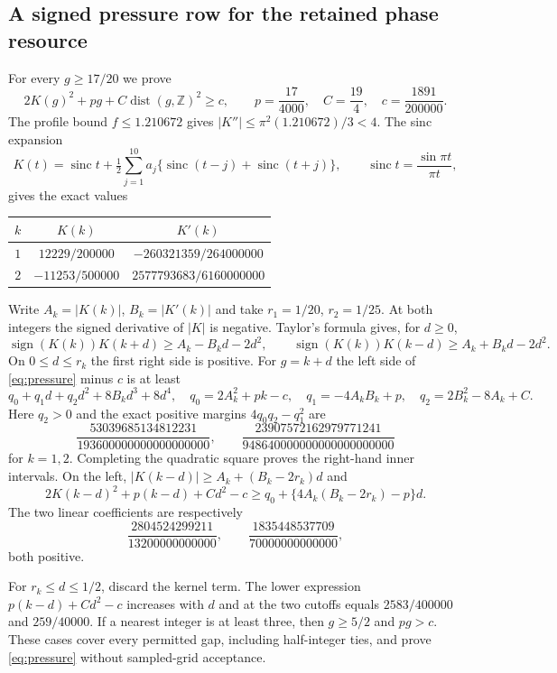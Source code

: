 \documentclass[11pt,reqno]{amsart}
\numberwithin{equation}{section}
\newcommand{\Z}{\mathbb Z}
\newcommand{\dist}{\operatorname{dist}}
\newcommand{\sinc}{\operatorname{sinc}}
\begin{document}
\subsection{A signed pressure row for the retained phase resource}
\label{sec:bootstrap}


For every $g\ge17/20$ we prove
\begin{equation}
 2K(g)^2+pg+C\dist(g,\Z)^2\ge c,
 \qquad p=\frac{17}{4000},\quad C=\frac{19}{4},\quad
 c=\frac{1891}{200000}.
 \label{eq:pressure}
\end{equation}
The profile bound $f\le1.210672$ gives
$|K''|\le\pi^2(1.210672)/3<4$.
The sinc expansion
\[
 K(t)=\sinc t+\tfrac12\sum_{j=1}^{10}a_j
 \{\sinc(t-j)+\sinc(t+j)\},\qquad
 \sinc t=\frac{\sin\pi t}{\pi t},
\]
gives the exact values
\begin{center}
\begin{tabular}{ccc}
\toprule $k$ & $K(k)$ & $K'(k)$\\\midrule
$1$ & $12229/200000$ & $-260321359/264000000$\\
$2$ & $-11253/500000$ & $2577793683/6160000000$\\\bottomrule
\end{tabular}
\end{center}
Write $A_k=|K(k)|$, $B_k=|K'(k)|$ and take
$r_1=1/20$, $r_2=1/25$. At both integers the signed derivative of
$|K|$ is negative. Taylor's formula gives, for $d\ge0$,
\[
 \operatorname{sign}(K(k))K(k+d)\ge A_k-B_kd-2d^2,
 \qquad
 \operatorname{sign}(K(k))K(k-d)\ge A_k+B_kd-2d^2.
\]
On $0\le d\le r_k$ the first right side is positive. For $g=k+d$
the left side of \eqref{eq:pressure} minus $c$ is at least
\[
 q_0+q_1d+q_2d^2+8B_kd^3+8d^4,
 \quad q_0=2A_k^2+pk-c,\quad
 q_1=-4A_kB_k+p,\quad q_2=2B_k^2-8A_k+C.
\]
Here $q_2>0$ and the exact positive margins $4q_0q_2-q_1^2$ are
\begin{equation}
 \frac{53039685134812231}{193600000000000000000},\qquad
 \frac{23907572162979771241}{948640000000000000000000}
 \label{eq:discriminants}
\end{equation}
for $k=1,2$. Completing the quadratic square proves the right-hand
inner intervals. On the left,
$|K(k-d)|\ge A_k+(B_k-2r_k)d$ and
\[
 2K(k-d)^2+p(k-d)+Cd^2-c
 \ge q_0+\{4A_k(B_k-2r_k)-p\}d.
\]
The two linear coefficients are respectively
\[
 \frac{2804524299211}{13200000000000},\qquad
 \frac{1835448537709}{70000000000000},
\]
both positive.

For $r_k\le d\le1/2$, discard the kernel term. The lower expression
$p(k-d)+Cd^2-c$ increases with $d$ and at the two cutoffs equals
$2583/400000$ and $259/40000$. If a nearest integer is at least
three, then $g\ge5/2$ and $pg>c$. These cases cover every permitted
gap, including half-integer ties, and prove \eqref{eq:pressure}
without sampled-grid acceptance.
\end{document}
